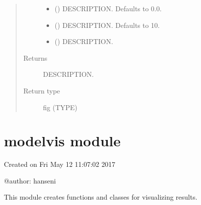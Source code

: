 \documentclass[letterpaper,10pt,english]{sphinxmanual}
\begin{document}
\begin{fulllineitems}
\begin{fulllineitems}
\begin{quote}
\begin{description}
\begin{itemize}
\item {} 
\sphinxAtStartPar
{} (\sphinxstyleliteralemphasis{\sphinxupquote{, }}) \textendash{} DESCRIPTION. Defaults to 0.0.

\item {} 
\sphinxAtStartPar
{} (\sphinxstyleliteralemphasis{\sphinxupquote{, }}) \textendash{} DESCRIPTION. Defaults to 10.

\item {} 
\sphinxAtStartPar
{} () \textendash{} DESCRIPTION.

\end{itemize}

\item[{Returns}] \leavevmode
\sphinxAtStartPar
DESCRIPTION.

\item[{Return type}] \leavevmode
\sphinxAtStartPar
fig (TYPE)

\end{description}\end{quote}

\end{fulllineitems}


\end{fulllineitems}


\sphinxstepscope


\section{modelvis module}
\label{\detokenize{vis/modelvis:module-modelvis}}\label{\detokenize{vis/modelvis:modelvis-module}}\label{\detokenize{vis/modelvis::doc}}
\sphinxAtStartPar
Created on Fri May 12 11:07:02 2017

\sphinxAtStartPar
@author: hanseni

\sphinxAtStartPar
This module creates functions and classes for visualizing results.
\end{document}
